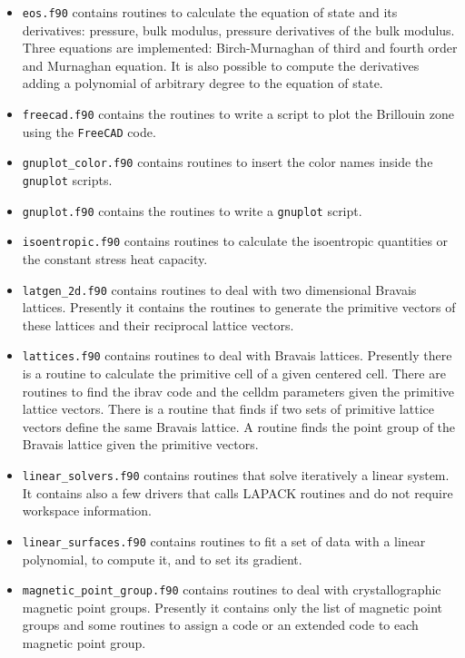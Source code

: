 \documentclass[12pt,a4paper,twoside]{report}
\begin{document}
\begin{itemize}
\item
\texttt{eos.f90} contains routines to calculate the equation of state and
its derivatives: pressure, bulk modulus, pressure derivatives of the bulk
modulus. Three equations are implemented: Birch-Murnaghan of third
and fourth order and Murnaghan equation. It is also possible to compute
the derivatives adding a polynomial of arbitrary degree to the equation
of state.

\item
\texttt{freecad.f90} contains the routines to write a script to plot the
Brillouin zone using the \texttt{FreeCAD} code.

\item
\texttt{gnuplot\_color.f90} contains routines to insert the color names
inside the \texttt{gnuplot} scripts.

\item
\texttt{gnuplot.f90} contains the routines to write a \texttt{gnuplot} script.

\item
\texttt{isoentropic.f90} contains routines to calculate the isoentropic
quantities or the constant stress heat capacity.

\item
\texttt{latgen\_2d.f90} contains routines to deal with two dimensional
Bravais lattices. Presently it contains the routines to generate the
primitive vectors of these lattices and their reciprocal lattice vectors.

\item \texttt{lattices.f90} contains routines to deal with Bravais lattices.
Presently there is a routine to calculate the primitive cell of
a given centered cell. There are routines to find the ibrav code and the
celldm parameters given the primitive lattice vectors. There is a routine
that finds if two sets of primitive lattice vectors define the same 
Bravais lattice. A routine finds the point group of the Bravais lattice
given the primitive vectors.

\item
\texttt{linear\_solvers.f90} contains routines that solve iteratively
a linear system. It contains also a few drivers that calls LAPACK routines
and do not require workspace information. 

\item
\texttt{linear\_surfaces.f90} contains routines to fit a set of data
with a linear polynomial, to compute it, and to set its gradient.  

\item
\texttt{magnetic\_point\_group.f90} contains routines to deal with 
crystallographic
magnetic point groups. Presently it contains only the list of magnetic
point groups and some routines to assign a code or an extended code to each
magnetic point group.


\end{itemize}
\end{document}
